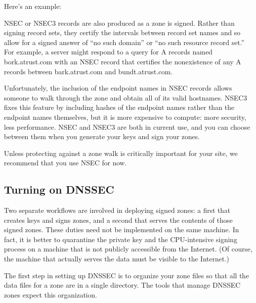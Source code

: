 Here's an example:


NSEC or NSEC3 records are also produced as a zone is signed. Rather than
signing record sets, they certify the intervals {between} record set
names and so allow for a signed answer of ``no such domain'' or ``no
such resource record set.'' For example, a server might respond to a
query for A records named bork.atrust.com with an NSEC record that
certifies the nonexistence of any A records between {bark.atrust.com}
and bundt.atrust.com.

Unfortunately, the inclusion of the endpoint names in NSEC records
allows someone to walk through the zone and obtain all of its valid
hostnames. NSEC3 fixes this feature by including hashes of the endpoint
names rather than the endpoint names themselves, but it is more
expensive to compute: more security, less performance. NSEC and NSEC3
are both in current use, and you can choose between them when you
generate your keys and sign your zones.

Unless protecting against a zone walk is critically important for your
site, we recommend that you use NSEC for now.

\protect\hypertarget{part0024_split_062.html}{}{}

\hypertarget{part0024_split_062.htmlux5cux23_idContainer1069}{}
\hypertarget{part0024_split_062.htmlux5cux23calibre_pb_61}{%
\subsection[Turning on
DNSSEC]{\texorpdfstring{\protect\hypertarget{part0024_split_062.htmlux5cux23_idTextAnchor941}{}{}Turning
on
DNSSEC}{Turning on DNSSEC}}\label{part0024_split_062.htmlux5cux23calibre_pb_61}}

Two separate workflows are involved in deploying signed zones: a first
that creates keys and signs zones, and a second that serves the contents
of those signed zones. These duties need not be implemented on the same
machine. In fact, it is better to quarantine the private key and the
CPU-intensive signing process on a machine that is not publicly
accessible from the Internet. (Of course, the machine that actually
serves the data must be visible to the Internet.)

The first step in setting up DNSSEC is to organize your zone files so
that all the data files for a zone are in a single directory. The tools
that manage DNSSEC zones expect this organization.

